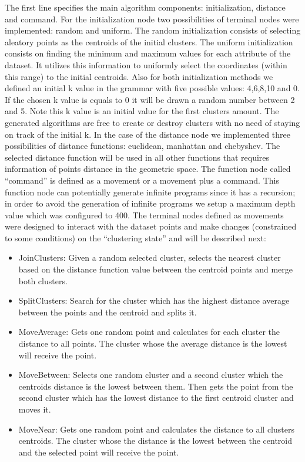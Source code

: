 \documentclass[journal]{IEEEtran}
\begin{document}
The first line specifies the main algorithm components: initialization, distance and command. For the initialization node two possibilities of terminal nodes were implemented: random and uniform. The random initialization consists of selecting aleatory points as the centroids of the initial clusters. The uniform initialization consists on finding the minimum and maximum values for each attribute of the dataset. It utilizes this information to uniformly select the coordinates (within this range)  to the  initial centroids. Also for both initialization methods we defined an initial k value in the grammar with five possible values: 4,6,8,10 and 0. If the chosen k value is equals to 0 it will be drawn a random number between 2 and 5. Note this k value is an initial value for the first clusters amount. The generated algorithms are free to create or destroy clusters with no need of staying on track of the initial k. In the case of the distance node we implemented three possibilities of distance functions: euclidean, manhattan and chebyshev. The selected distance function will be used in all other functions that requires information of points distance in the geometric space. The function node called “command” is defined as a movement or a movement plus a command. This function node can potentially generate infinite programs since it has a recursion; in order to avoid the generation of infinite programs we setup a maximum depth value which was configured to 400. The terminal nodes defined as movements were designed to interact with the dataset points and make changes (constrained to some conditions) on the “clustering state” and will be described next:

\begin{itemize}
	\item JoinClusters: Given a random selected cluster, selects the nearest cluster based on the distance function value between the centroid points and merge both clusters.
	\item SplitClusters: Search for the cluster which has the highest distance average between the points and the centroid and splits it. 
	\item MoveAverage: Gets one random point and calculates for each cluster the distance to all points. The cluster whose the average distance is the lowest will receive the point.
	\item MoveBetween: Selects one random cluster and a second cluster which the centroids distance is the lowest between them. Then gets the point from the second cluster which has the lowest distance to the first centroid cluster and moves it.
	\item MoveNear: Gets one random point and calculates the distance to all clusters centroids. The cluster whose the distance is the lowest between the centroid and the selected point will receive the point.
\end{itemize}
\end{document}
